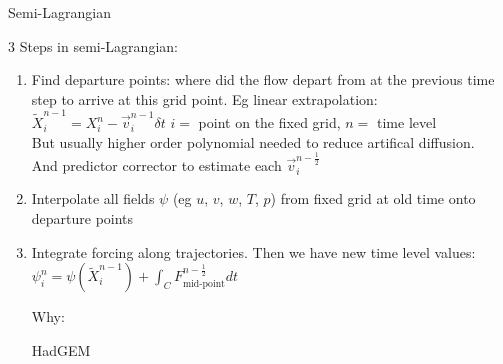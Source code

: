 \begin{slide}{Semi-Lagrangian}

3 Steps in semi-Lagrangian:
\begin{enumerate}
\item Find departure points: where did the flow depart from at the previous time step to arrive at this grid point. Eg linear extrapolation:\\
$\tilde{X}^{n-1}_i = X^n_i - \vec{v}^{n-1}_i \delta t$ \hspace{2cm}
$i =$ point on the fixed grid, $n =$ time level
\\
But usually higher order polynomial needed to reduce artifical diffusion. \\
And predictor corrector to estimate each $\vec{v}^{n-\frac{1}{2}}_i$
\item Interpolate all fields $\psi$ (eg $u$, $v$, $w$, $T$, $p$) from fixed grid at old time onto departure points
\item Integrate forcing along trajectories. Then we have new time level values:\\
$\psi^n_i = \psi(\tilde{X}^{n-1}_i) + \int_C F^{n-\frac{1}{2}}_\text{mid-point} dt$

\hspace{-3ex}Why:

\hspace{-3ex}HadGEM
\end{enumerate}

\end{slide}

